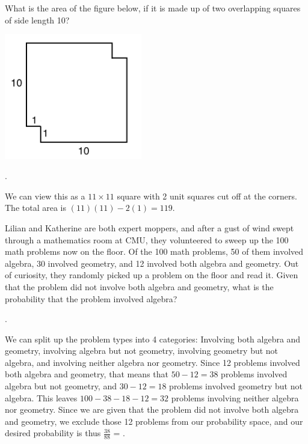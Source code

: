 \documentclass[11pt]{article}
\begin{document}
\begin{problem}
What is the area of the figure below, if it is made up of two overlapping squares of side length 10?
\begin{center}
\includegraphics[width=6cm]{squares.png}
\end{center}
\end{problem}

\begin{answer}
.
\end{answer}

\begin{solution}
We can view this as a $11\times11$ square with 2 unit squares cut off at the corners. The total area is $(11)(11)-2(1) = \boxed{119}$.
\end{solution}

\begin{problem}
Lilian and Katherine are both expert moppers, and after a gust of wind swept through a mathematics room at CMU, they volunteered to sweep up the 100 math problems now on the floor. Of the 100 math problems, 50 of them involved algebra, 30 involved geometry, and 12 involved both algebra and geometry. Out of curiosity, they randomly picked up a problem on the floor and read it. Given that the problem did not involve both algebra and geometry, what is the probability that the problem involved algebra?
\end{problem}

\begin{answer}
.
\end{answer}

\begin{solution}
We can split up the problem types into 4 categories: Involving both algebra and geometry, involving algebra but not geometry, involving geometry but not algebra, and involving neither algebra nor geometry. Since 12 problems involved both algebra and geometry, that means that $50-12 = 38$ problems involved algebra but not geometry, and $30-12 = 18$ problems involved geometry but not algebra. This leaves $100 - 38 - 18 - 12 = 32$ problems involving neither algebra nor geometry. Since we are given that the problem did not involve both algebra and geometry, we exclude those 12 problems from our probability space, and our desired probability is thus $\frac{38}{88}$ = .
\end{solution}
\end{document}
